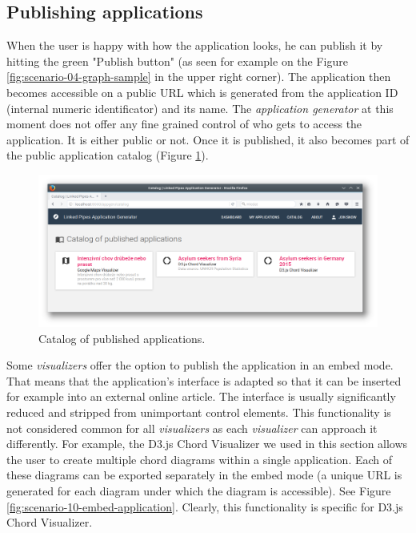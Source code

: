\subsection{Publishing applications}

When the user is happy with how the application looks, he can publish it by hitting the green "Publish button" (as seen for example on the Figure \ref{fig:scenario-04-graph-sample} in the upper right corner). The application then becomes accessible on a public URL which is generated from the application ID (internal numeric identificator) and its name. The \emph{application generator} at this moment does not offer any fine grained control of who gets to access the application. It is either public or not. Once it is published, it also becomes part of the public application catalog (Figure \ref{fig:catalog}).

\begin{figure}
	\centering
	\includegraphics[width=145mm]{img/05_catalog}
	\caption{Catalog of published applications.}
    \label{fig:catalog}
\end{figure}

Some \emph{visualizers} offer the option to publish the application in an embed mode. That means that the application's interface is adapted so that it can be inserted for example into an external online article. The interface is usually significantly reduced and stripped from unimportant  control elements. This functionality is not considered common for all \emph{visualizers}  as each \emph{visualizer} can approach it differently. For example, the D3.js Chord Visualizer we used in this section allows the user to create multiple chord diagrams within a single application. Each of these diagrams can be exported separately in the embed mode (a unique URL is generated for each diagram under which the diagram is accessible). See Figure \ref{fig:scenario-10-embed-application}. Clearly, this functionality is specific for D3.js Chord Visualizer.

